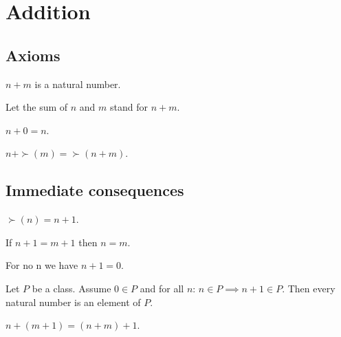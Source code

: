 \documentclass[../../natural-numbers.ftl.tex]{subfiles}
\begin{document}


  \section{Addition}

  \subsection{Axioms}

  \begin{forthel}
    \begin{signature}
      $n + m$ is a natural number.
    \end{signature}

    Let the sum of $n$ and $m$ stand for $n + m$.

    \begin{axiom}
      $n + 0 = n$.
    \end{axiom}

    \begin{axiom}
      $n + \succ(m) = \succ(n + m)$.
    \end{axiom}
  \end{forthel}


  \subsection{Immediate consequences}

  \begin{forthel}
    \begin{lemma}
      $\succ(n) = n + 1$.
    \end{lemma}

    \begin{corollary}
      If $n + 1 = m + 1$ then $n = m$.
    \end{corollary}

    \begin{corollary}
      For no n we have $n + 1 = 0$.
    \end{corollary}

    \begin{corollary}
      Let $P$ be a class.
      Assume $0 \in P$ and for all $n$: $n \in P \implies n + 1 \in P$.
      Then every natural number is an element of $P$.
    \end{corollary}

    \begin{corollary}
      $n + (m + 1) = (n + m) + 1$.
    \end{corollary}
  \end{forthel}
\end{document}

